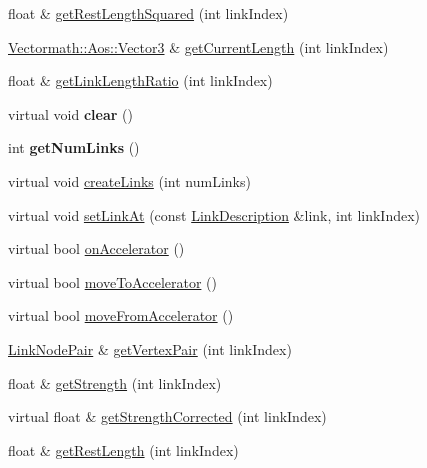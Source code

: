 \begin{DoxyCompactItemize}
\item 
float \& \hyperlink{classbtSoftBodyLinkData_a7ea5bd9cf45bdf9ae4872437e0f867b8}{get\+Rest\+Length\+Squared} (int link\+Index)
\item 
\hyperlink{classVectormath_1_1Aos_1_1Vector3}{Vectormath\+::\+Aos\+::\+Vector3} \& \hyperlink{classbtSoftBodyLinkData_a9655532adc375429002af37fe757ef3b}{get\+Current\+Length} (int link\+Index)
\item 
float \& \hyperlink{classbtSoftBodyLinkData_a1d1b051d331898d172d709676dca5ad7}{get\+Link\+Length\+Ratio} (int link\+Index)
\item 
\mbox{\label{classbtSoftBodyLinkData_a9a664715147e0f7858236fd2251fc298}} 
virtual void {\bfseries clear} ()
\item 
\mbox{\label{classbtSoftBodyLinkData_a5699392f6a67800771651d3ac5a26350}} 
int {\bfseries get\+Num\+Links} ()
\item 
virtual void \hyperlink{classbtSoftBodyLinkData_a1713d14604037ca88d7915d627a32a13}{create\+Links} (int num\+Links)
\item 
virtual void \hyperlink{classbtSoftBodyLinkData_a44f200dcb878405cebf3704dc7a8b8cd}{set\+Link\+At} (const \hyperlink{classbtSoftBodyLinkData_1_1LinkDescription}{Link\+Description} \&link, int link\+Index)
\item 
virtual bool \hyperlink{classbtSoftBodyLinkData_ae284c2a182ddf82dde057a8c2eb17ac3}{on\+Accelerator} ()
\item 
virtual bool \hyperlink{classbtSoftBodyLinkData_a6cce268f804d465f3bc998771d3a7433}{move\+To\+Accelerator} ()
\item 
virtual bool \hyperlink{classbtSoftBodyLinkData_a5018ad236aae590df94bca63c1ad7ee1}{move\+From\+Accelerator} ()
\item 
\hyperlink{classbtSoftBodyLinkData_1_1LinkNodePair}{Link\+Node\+Pair} \& \hyperlink{classbtSoftBodyLinkData_ab0e3a69e9aec84ed318b3a3d17f57051}{get\+Vertex\+Pair} (int link\+Index)
\item 
float \& \hyperlink{classbtSoftBodyLinkData_aedff3a1100ab4177e7035a6400f91b87}{get\+Strength} (int link\+Index)
\item 
virtual float \& \hyperlink{classbtSoftBodyLinkData_a3b6e8d1a150ec23efd999760ea7a17b3}{get\+Strength\+Corrected} (int link\+Index)
\item 
float \& \hyperlink{classbtSoftBodyLinkData_a2552fa98541e800fc6de8ef7ec2a6a8e}{get\+Rest\+Length} (int link\+Index)

\end{DoxyCompactItemize}
